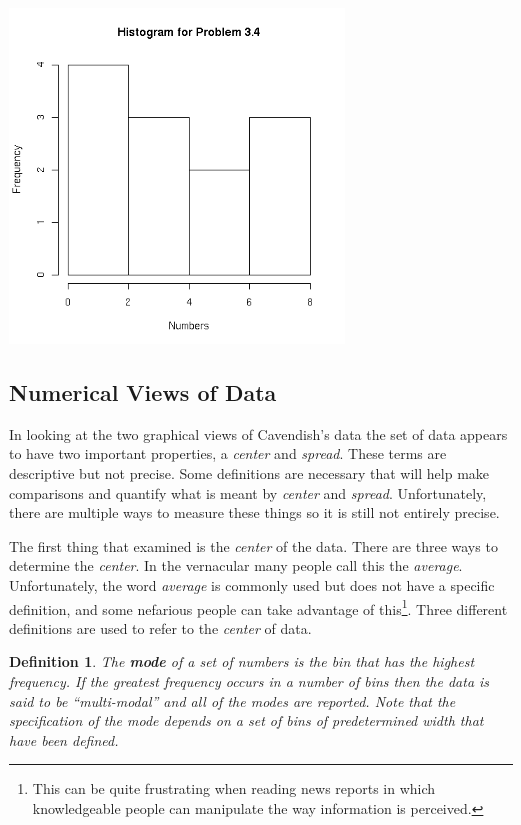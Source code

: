 \documentclass[12pt]{article}
\newtheorem{definition}{Definition}[section]
\begin{document}
\centerline{\includegraphics[width=3.5in]{prob34}}
\fi



\subsection{Numerical Views of Data}
\label{subsect:numericalDescription}

In looking at the two graphical views of Cavendish's data the set of
data appears to have two important properties, a \textit{center} and
\textit{spread}. These terms are descriptive but not precise.  Some
definitions are necessary that will help make comparisons and quantify
what is meant by \textit{center} and \textit{spread}.  Unfortunately,
there are multiple ways to measure these things so it is still not
entirely precise.

The first thing that examined is the \textit{center} of the data.
There are three ways to determine the \textit{center}. In the
vernacular many people call this the \textit{average}.  Unfortunately,
the word \textit{average} is commonly used but does not have a
specific definition, and some nefarious people can take advantage of
this\footnote{This can be quite frustrating when reading news reports
  in which knowledgeable people can manipulate the way information is
  perceived.}.  Three different definitions are used to refer to the
\textit{center} of data.



\begin{definition}
  The \textbf{mode} of a set of numbers is the bin that has the
  highest frequency. If the greatest frequency occurs in a number of
  bins then the data is said to be ``multi-modal'' and all of the
  modes are reported. Note that the specification of the mode depends
  on a set of bins of predetermined width that have been defined.
\end{definition}
\end{document}
